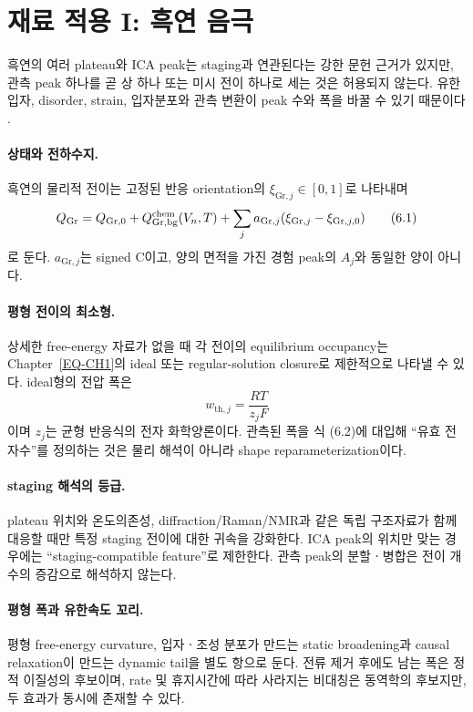 \section{재료 적용 I: 흑연 음극}\label{MAT-GR-000}

흑연의 여러 plateau와 ICA peak는 staging과 연관된다는 강한
문헌 근거가 있지만, 관측 peak 하나를 곧 상 하나 또는 미시 전이
하나로 세는 것은 허용되지 않는다. 유한입자, disorder, strain,
입자분포와 관측 변환이 peak 수와 폭을 바꿀 수 있기 때문이다
\cite{dahn,funabiki,reynier}.

\paragraph{ 상태와 전하수지.}
흑연의 물리적 전이는 고정된 반응 orientation의
$\xi_{\mathrm{Gr},j}\in[0,1]$로 나타내며
\[
 Q_\mathrm{Gr}
 =Q_{\mathrm{Gr},0}
 +Q_{\mathrm{Gr},\mathrm{bg}}^{\mathrm{chem}}(V_n,T)
 +\sum_j a_{\mathrm{Gr},j}
   (\xi_{\mathrm{Gr},j}-\xi_{\mathrm{Gr},j,0})
 \tag{6.1}
\]
로 둔다. $a_{\mathrm{Gr},j}$는 signed C이고, 양의 면적을 가진
경험 peak의 $A_j$와 동일한 양이 아니다.

\paragraph{ 평형 전이의 최소형.}
상세한 free-energy 자료가 없을 때 각 전이의 equilibrium occupancy는
Chapter~\ref{EQ-CH1}의 ideal 또는 regular-solution closure로
제한적으로 나타낼 수 있다. ideal형의 전압 폭은
\[
 w_{\mathrm{th},j}=\frac{RT}{z_jF}
 \tag{6.2}
\]
이며 $z_j$는 균형 반응식의 전자 화학양론이다. 관측된 폭을 식
(6.2)에 대입해 ``유효 전자수''를 정의하는 것은 물리 해석이 아니라
shape reparameterization이다.

\paragraph{ staging 해석의 등급.}
plateau 위치와 온도의존성, diffraction/Raman/NMR과 같은 독립
구조자료가 함께 대응할 때만 특정 staging 전이에 대한 귀속을
강화한다. ICA peak의 위치만 맞는 경우에는 ``staging-compatible
feature''로 제한한다. 관측 peak의 분할ㆍ병합은 전이 개수의 증감으로
해석하지 않는다.

\paragraph{ 평형 폭과 유한속도 꼬리.}
평형 free-energy curvature, 입자ㆍ조성 분포가 만드는 static
broadening과 causal relaxation이 만드는 dynamic tail을 별도 항으로
둔다. 전류 제거 후에도 남는 폭은 정적 이질성의 후보이며,
rate 및 휴지시간에 따라 사라지는 비대칭은 동역학의 후보지만,
두 효과가 동시에 존재할 수 있다.

